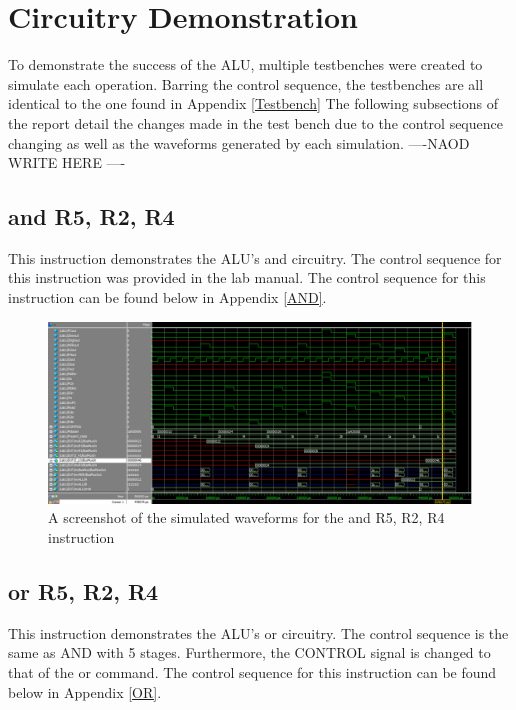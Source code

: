 \documentclass{article}
\begin{document}
\section{Circuitry Demonstration}

    To demonstrate the success of the ALU, multiple testbenches were created to simulate each operation. Barring the control sequence, the testbenches are all identical to the one found in Appendix \ref{Testbench} The following subsections of the report detail the changes made in the test bench due to the control sequence changing as well as the waveforms generated by each simulation. ----NAOD WRITE HERE ----

    \subsection{and R5, R2, R4}
    This instruction demonstrates the ALU's and circuitry. The control sequence for this instruction was provided in the lab manual. The control sequence for this instruction can be found below in Appendix \ref{AND}.
    
    \begin{figure}[h!]
        \begin{center}
            \includegraphics[width=13cm]{ADD_final_image.png}
            \caption{A screenshot of the simulated waveforms for the and R5, R2, R4 instruction}
        \end{center}
    \end{figure}

    \subsection{or R5, R2, R4}
     This instruction demonstrates the ALU's or circuitry. The control sequence is the same as AND with 5 stages. Furthermore, the CONTROL signal is changed to that of the or command. The control sequence for this instruction can be found below in Appendix \ref{OR}.
     
\end{document}
